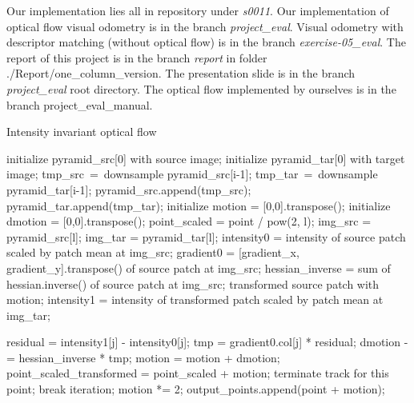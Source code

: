 \documentclass[11pt]{easychair}
\begin{document}
\begin{appendices}
	Our implementation lies all in repository under \emph{s0011}. Our implementation of optical flow visual odometry is in the branch \emph{project\_eval}. Visual odometry with descriptor matching (without optical flow) is in the branch \emph{exercise-05\_eval}. The report of this project is in the branch \emph{report} in folder ./Report/one\_column\_version. The presentation slide is in the branch \emph{project\_eval} root directory. The optical flow implemented by ourselves is in the branch project\_eval\_manual.
	
	\begin{algorithm}[h]
		\caption{Intensity invariant optical flow}  
		\label{alg:optf}
		\begin{algorithmic}[1]
			\State initialize pyramid\_src[0] with source image;
			\State initialize pyramid\_tar[0] with target image;
			\State tmp\_src\ =\ downsample pyramid\_src[i-1];
			\State tmp\_tar\ =\ downsample pyramid\_tar[i-1];
			\State pyramid\_src.append(tmp\_src);
			\State pyramid\_tar.append(tmp\_tar);
			\EndFor
			\State initialize motion = [0,0].transpose();
			\State initialize dmotion = [0,0].transpose();
			\State point\_scaled = point / pow(2, l);
			\State img\_src = pyramid\_src[l];
			\State img\_tar = pyramid\_tar[l];
			\State intensity0 = intensity of source patch scaled by patch mean at img\_src;
			\State gradient0 = [gradient\_x, gradient\_y].transpose() of source patch at img\_src;
			\State hessian\_inverse = sum of hessian.inverse() of source patch at img\_src;
			\State transformed source patch with motion;
			\State intensity1 = intensity of transformed patch scaled by patch mean at img\_tar;
			
			\State residual = intensity1[j] - intensity0[j];
			\State tmp = gradient0.col[j] * residual;
			\State dmotion -= hessian\_inverse * tmp;
			\EndFor
			\State motion = motion + dmotion;
			\State point\_scaled\_transformed = point\_scaled + motion;
			\State terminate track for this point;
			\EndIf
			\State break iteration;
			\EndIf
			\EndFor
			\State motion *= 2;      
			\EndFor 
			\State output\_points.append(point + motion);
			\EndFor 
		\end{algorithmic}  
		
	\end{algorithm}  
	
\end{appendices}


%
%
%
%
%
\end{document}
